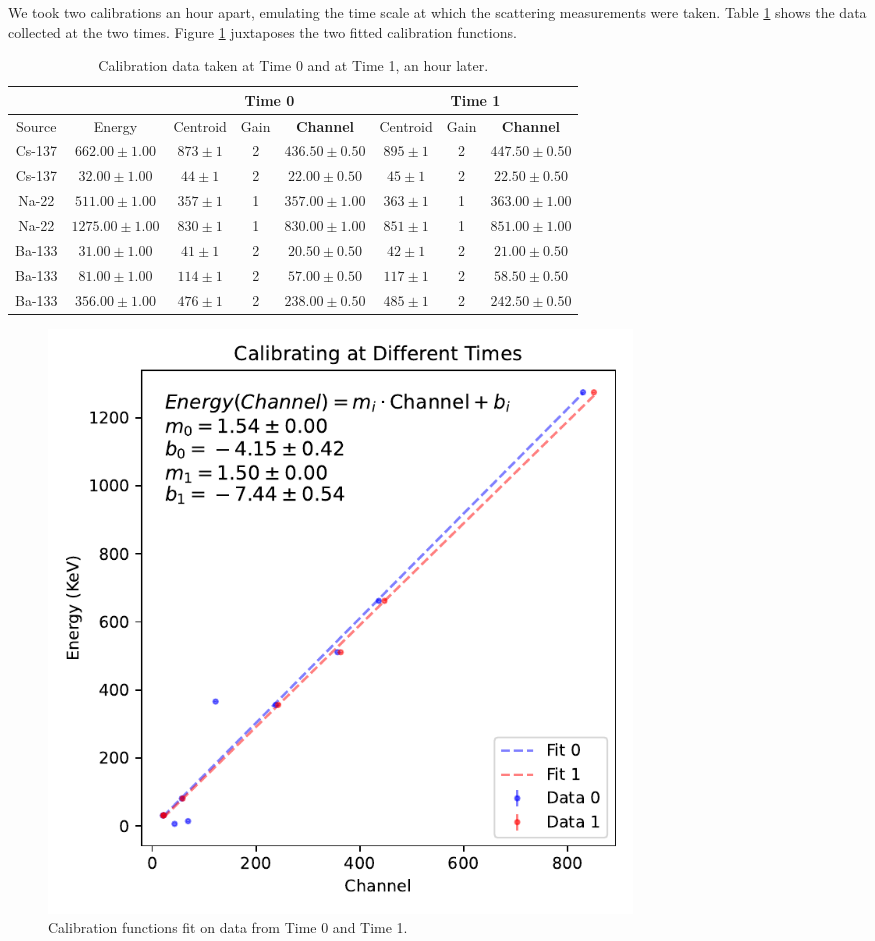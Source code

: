 \documentclass[12pt, letterpaper]{article}
\begin{document}
We took two calibrations an hour apart, emulating the time scale at which the scattering measurements were taken. Table \ref{table:gain-drift} shows the data collected at the two times. Figure \ref{fig:gain-drift} juxtaposes the two fitted calibration functions. 

\begin{table}[!h]
\footnotesize
\centering
\begin{tabular}{| c c | c c | c | c c | c |}
    \cline{3-8}
    \multicolumn{2}{c|}{} & \multicolumn{3}{c|}{Time 0} & \multicolumn{3}{c|}{Time 1} \\
    \hline
    Source & Energy & Centroid & Gain & \textbf{Channel} & Centroid & Gain & \textbf{Channel} \\
    \hline
    Cs-137 & $662.00 \pm 1.00$ & $873 \pm 1$ & 2 & $436.50 \pm 0.50$ & $895 \pm 1$ & 2 & $447.50 \pm 0.50$ \\
    Cs-137 & $32.00 \pm 1.00$ & $44 \pm 1$ & 2 & $22.00 \pm 0.50$ & $45 \pm 1$ & 2 & $22.50 \pm 0.50$ \\
    Na-22 & $511.00 \pm 1.00$ & $357 \pm 1$ & 1 & $357.00 \pm 1.00$ & $363 \pm 1$ & 1 & $363.00 \pm 1.00$ \\
    Na-22 & $1275.00 \pm 1.00$ & $830 \pm 1$ & 1 & $830.00 \pm 1.00$ & $851 \pm 1$ & 1 & $851.00 \pm 1.00$ \\
    Ba-133 & $31.00 \pm 1.00$ & $41 \pm 1$ & 2 & $20.50 \pm 0.50$ & $42 \pm 1$ & 2 & $21.00 \pm 0.50$ \\
    Ba-133 & $81.00 \pm 1.00$ & $114 \pm 1$ & 2 & $57.00 \pm 0.50$ & $117 \pm 1$ & 2 & $58.50 \pm 0.50$ \\
    Ba-133 & $356.00 \pm 1.00$ & $476 \pm 1$ & 2 & $238.00 \pm 0.50$ & $485 \pm 1$ & 2 & $242.50 \pm 0.50$ \\
    \hline
\end{tabular}
\caption{Calibration data taken at Time 0 and at Time 1, an hour later. }
\label{table:gain-drift}
\end{table}

\begin{figure}[!h]
    \centering
    \includegraphics[width=0.75\textwidth]{experiment2/figures/gain-drift.pdf}
    \caption{Calibration functions fit on data from Time 0 and Time 1.}
    \label{fig:gain-drift}
\end{figure}
\end{document}
